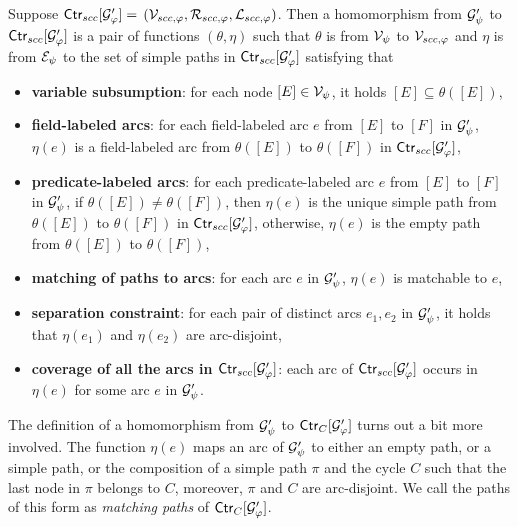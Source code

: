 \documentclass{llncs}
\begin{document}
\vspace{-1mm}
\begin{definition}\label{def-hom-scc}
Suppose ${\sf Ctr}_{scc}[\mathcal{G}'_\varphi]=$ $ (\mathcal{V}_{scc,\varphi}, \mathcal{R}_{scc,\varphi}, \mathcal{L}_{scc,\varphi})$. Then a homomorphism from $\mathcal{G}'_\psi$  to ${\sf Ctr}_{scc}[\mathcal{G}'_\varphi]$ is a pair of functions $(\theta,\eta)$ such that $\theta$ is from $\mathcal{V}_\psi$ to $\mathcal{V}_{scc,\varphi}$ and $\eta$ is  from $\mathcal{E}_\psi$ to the set of simple paths in ${\sf Ctr}_{scc}[\mathcal{G}'_\varphi]$ satisfying that
\begin{itemize}
\item{\bf variable subsumption}: for each node $[E] \in \mathcal{V}_{\psi}$, it holds $[E] \subseteq \theta([E])$,
%
\item{\bf field-labeled arcs}: for each field-labeled arc $e$ from $[E]$ to $[F]$ in $\mathcal{G}'_{\psi}$, $\eta(e)$ is a field-labeled arc from $\theta([E])$ to $\theta([F])$ in ${\sf Ctr}_{scc}[\mathcal{G}'_{\varphi}]$,
%
\item{\bf predicate-labeled arcs}: for each predicate-labeled arc $e$ from $[E]$ to $[F]$ in $\mathcal{G}'_{\psi}$, if $\theta([E]) \neq \theta([F])$, then $\eta(e)$ is the unique simple path from $\theta([E])$ to $\theta([F])$ in ${\sf Ctr}_{scc}[\mathcal{G}'_\varphi]$, otherwise, $\eta(e)$ is the empty path from $\theta([E])$ to $\theta([F])$,
%
%
\item {\bf matching of paths to arcs}: for each arc $e$ in $\mathcal{G}'_\psi$, $\eta(e)$ is matchable to $e$,

\item {\bf separation constraint}: for each pair of distinct arcs $e_1,e_2$ in $\mathcal{G}'_\psi$, it holds that $\eta(e_1)$ and $\eta(e_2)$ are arc-disjoint,
%
\item {\bf coverage of all the arcs in ${\sf Ctr}_{scc}[\mathcal{G}'_{\varphi}]$}: each arc of ${\sf Ctr}_{scc}[\mathcal{G}'_{\varphi}]$ occurs in $\eta(e)$ for some arc $e$ in $\mathcal{G}'_{\psi}$.
\end{itemize}
\end{definition}
\vspace{-2mm}


The definition of a homomorphism from $\mathcal{G}'_\psi$ to ${\sf Ctr}_C[\mathcal{G}'_\varphi]$ turns out a bit more involved. The function $\eta(e)$ maps an arc of $\mathcal{G}'_\psi$ to either an empty path, or a simple path, or the composition of a simple path $\pi$ and the cycle $C$ such that the last node in $\pi$ belongs to $C$, moreover, $\pi$ and $C$ are arc-disjoint. We call the paths of this form as \emph{matching paths} of ${\sf Ctr}_C[\mathcal{G}'_\varphi]$.
\end{document}
